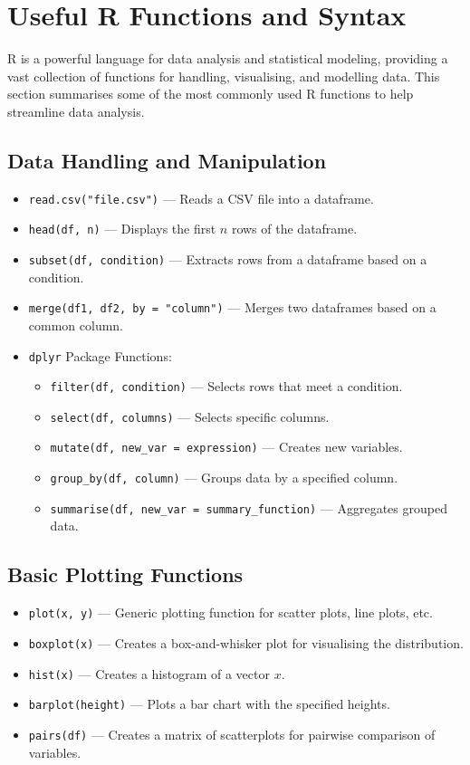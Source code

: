 \section{Useful R Functions and Syntax}

R is a powerful language for data analysis and statistical modeling, providing a vast collection of functions for handling, visualising, and modelling data. This section summarises some of the most commonly used R functions to help streamline data analysis.

\subsection{Data Handling and Manipulation}

\begin{itemize}
    \item \texttt{read.csv("file.csv")} --- Reads a CSV file into a dataframe.
    \item \texttt{head(df, n)} --- Displays the first \( n \) rows of the dataframe.
    \item \texttt{subset(df, condition)} --- Extracts rows from a dataframe based on a condition.
    \item \texttt{merge(df1, df2, by = "column")} --- Merges two dataframes based on a common column.
    \item \texttt{dplyr} Package Functions:
    \begin{itemize}
        \item \texttt{filter(df, condition)} --- Selects rows that meet a condition.
        \item \texttt{select(df, columns)} --- Selects specific columns.
        \item \texttt{mutate(df, new\_var = expression)} --- Creates new variables.
        \item \texttt{group\_by(df, column)} --- Groups data by a specified column.
        \item \texttt{summarise(df, new\_var = summary\_function)} --- Aggregates grouped data.
    \end{itemize}
\end{itemize}

\subsection{Basic Plotting Functions}

\begin{itemize}
    \item \texttt{plot(x, y)} --- Generic plotting function for scatter plots, line plots, etc.
    \item \texttt{boxplot(x)} --- Creates a box-and-whisker plot for visualising the distribution.
    \item \texttt{hist(x)} --- Creates a histogram of a vector \( x \).
    \item \texttt{barplot(height)} --- Plots a bar chart with the specified heights.
    \item \texttt{pairs(df)} --- Creates a matrix of scatterplots for pairwise comparison of variables.
\end{itemize}

